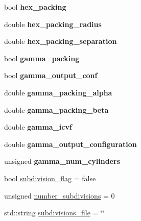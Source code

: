 \begin{DoxyCompactItemize}
\mbox{\label{class_parameters_aad79d8e720492fd880ee021c6320dfe0}} 
bool {\bfseries hex\+\_\+packing}
\item 
\mbox{\label{class_parameters_a3c49b55dc2a2af1c5ddfc3426e2a7936}} 
double {\bfseries hex\+\_\+packing\+\_\+radius}
\item 
\mbox{\label{class_parameters_a480338071cedf966fdb79b37d9ebe656}} 
double {\bfseries hex\+\_\+packing\+\_\+separation}
\item 
\mbox{\label{class_parameters_aaef8b4218392fb19de2c5c886f5f7fa0}} 
bool {\bfseries gamma\+\_\+packing}
\item 
\mbox{\label{class_parameters_ae7568296f688ccea271336e882162e7e}} 
bool {\bfseries gamma\+\_\+output\+\_\+conf}
\item 
\mbox{\label{class_parameters_a29d423618cf9acb2bbfe071fac98ec29}} 
double {\bfseries gamma\+\_\+packing\+\_\+alpha}
\item 
\mbox{\label{class_parameters_a2b10c9b8191ca74923f07d74b8f7e30a}} 
double {\bfseries gamma\+\_\+packing\+\_\+beta}
\item 
\mbox{\label{class_parameters_a97df7bda4427bbdd7b7e0aa2cd23e858}} 
double {\bfseries gamma\+\_\+icvf}
\item 
\mbox{\label{class_parameters_a484419e6ab0c0661ff7825fbe6d5a963}} 
double {\bfseries gamma\+\_\+output\+\_\+configuration}
\item 
\mbox{\label{class_parameters_a6e8dfd894eef31a43bd7bb0de5f02f37}} 
unsigned {\bfseries gamma\+\_\+num\+\_\+cylinders}
\item 
bool \hyperlink{class_parameters_a43362cb6e3ea49cc9db9e52c3ebc7140}{subdivision\+\_\+flag} = false
\item 
unsigned \hyperlink{class_parameters_a0d15fd8f1f5c332174864c3acbaf5e10}{number\+\_\+subdivisions} = 0
\item 
std\+::string \hyperlink{class_parameters_a1733bfcb8391c494b7b1a317dfda5e44}{subdivisions\+\_\+file} = \char`\"{}\char`\"{}

\end{DoxyCompactItemize}
